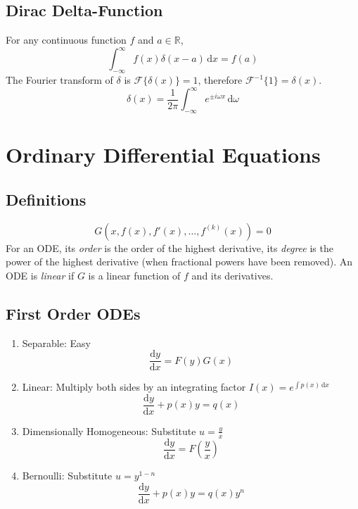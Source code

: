 \documentclass{article}
\begin{document}
\subsection{Dirac Delta-Function}
For any continuous function $f$ and $a \in \mathbb{R}$,
\begin{equation*}
    \int_{-\infty}^{\infty} f(x) \delta(x - a) \, \mathrm{d}x = f(a)
\end{equation*}
The Fourier transform of $\delta$ is $\mathcal{F}\{\delta(x)\} = 1$, therefore $\mathcal{F}^{-1}\{1\} = \delta(x)$.
\begin{equation*}
    \delta(x) = \frac{1}{2\pi} \int_{-\infty}^{\infty} e^{\pm i \omega x} \, \mathrm{d} \omega
\end{equation*}

\section{Ordinary Differential Equations}

\subsection{Definitions}

\begin{equation*}
    G(x, f(x), f'(x), \ldots, f^{(k)}(x)) = 0
\end{equation*}
For an ODE, its \emph{order} is the order of the highest derivative, its \emph{degree} is the power of the highest derivative (when fractional powers have been removed). An ODE is \emph{linear} if $G$ is a linear function of $f$ and its derivatives.

\subsection{First Order ODEs}

\begin{enumerate}
    \item Separable: Easy
    \begin{equation*}
        \frac{\mathrm{d}y}{\mathrm{d}x} = F(y) G(x)
    \end{equation*}
    \item Linear: Multiply both sides by an integrating factor $I(x) = e^{\int p(x) \, \mathrm{d}x}$
    \begin{equation*}
        \frac{\mathrm{d}y}{\mathrm{d}x} + p(x) y = q(x)
    \end{equation*}
    \item Dimensionally Homogeneous: Substitute $u = \frac{y}{x}$
    \begin{equation*}
        \frac{\mathrm{d}y}{\mathrm{d}x} = F\left(\frac{y}{x}\right)
    \end{equation*}
    \item Bernoulli: Substitute $u = y^{1 - n}$
    \begin{equation*}
        \frac{\mathrm{d}y}{\mathrm{d}x} + p(x) y = q(x) y^n
    \end{equation*}
\end{enumerate}
\end{document}
